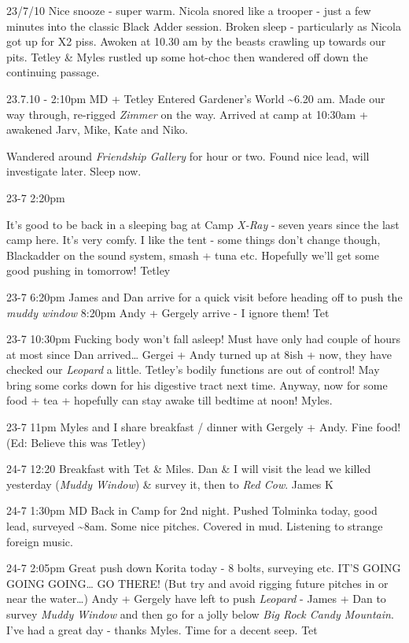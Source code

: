 
23/7/10 Nice snooze - super warm. Nicola snored like a trooper - just a
few minutes into the classic Black Adder session. Broken sleep -
particularly as Nicola got up for X2 piss. Awoken at 10.30 am by the
beasts crawling up towards our pits. Tetley \& Myles rustled up some
hot-choc then wandered off down the continuing passage.

23.7.10 - 2:10pm MD + Tetley Entered Gardener's World
\textasciitilde 6.20 am. Made our way through, re-rigged \emph{Zimmer}
on the way. Arrived at camp at 10:30am + awakened Jarv, Mike, Kate and
Niko.

Wandered around \emph{Friendship Gallery} for hour or two. Found nice
lead, will investigate later. Sleep now.

23-7 2:20pm

It's good to be back in a sleeping bag at Camp \emph{X-Ray} - seven
years since the last camp here. It's very comfy. I like the tent - some
things don't change though, Blackadder on the sound system, smash + tuna
etc. Hopefully we'll get some good pushing in tomorrow! Tetley

23-7 6:20pm James and Dan arrive for a quick visit before heading off to
push the \emph{muddy window} 8:20pm Andy + Gergely arrive - I ignore
them! Tet

23-7 10:30pm Fucking body won't fall asleep! Must have only had couple
of hours at most since Dan arrived\ldots{} Gergei + Andy turned up at
8ish + now, they have checked our \emph{Leopard} a little. Tetley's
bodily functions are out of control! May bring some corks down for his
digestive tract next time. Anyway, now for some food + tea + hopefully
can stay awake till bedtime at noon! Myles.

23-7 11pm Myles and I share breakfast / dinner with Gergely + Andy. Fine
food! (Ed: Believe this was Tetley)

24-7 12:20 Breakfast with Tet \& Miles. Dan \& I will visit the lead we
killed yesterday (\emph{Muddy Window}) \& survey it, then to \emph{Red
Cow}. James K

24-7 1:30pm MD Back in Camp for 2nd night. Pushed Tolminka today, good
lead, surveyed \textasciitilde 8am. Some nice pitches. Covered in mud.
Listening to strange foreign music.

24-7 2:05pm Great push down Korita today - 8 bolts, surveying etc. IT'S
GOING GOING GOING\ldots{} GO THERE! (But try and avoid rigging future
pitches in or near the water\ldots{}) Andy + Gergely have left to push
\emph{Leopard} - James + Dan to survey \emph{Muddy Window} and then go
for a jolly below \emph{Big Rock Candy Mountain}. I've had a great day -
thanks Myles. Time for a decent seep. Tet


